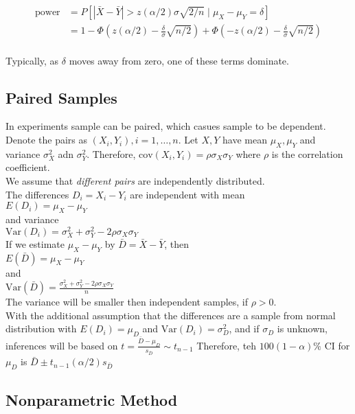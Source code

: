 \documentclass[12pt]{article}
\newcommand{\var}{\mathrm{Var}}
\newcommand{\cov}{\mathrm{cov}}
\theoremstyle{definition}
\begin{document}
\begin{align*}
\text{power}&=P[|\bar{X}-\bar{Y}|>z(\alpha/2)\sigma\sqrt{2/n}\mid \mu_X-\mu_Y=\delta]\\
&=1-\Phi(z(\alpha/2)-\frac{\delta}{\sigma}\sqrt{n/2})+\Phi(-z(\alpha/2)-\frac{\delta}{\sigma}\sqrt{n/2})
\end{align*}
\\
Typically, as $\delta$ moves away from zero, one of these terms dominate.



\subsection{Paired Samples}
In experiments sample can be paired, which casues sample to be dependent. Denote the pairs as $(X_i,Y_i), i=1, \ldots, n$. Let $X,Y$ have mean $\mu_X,\mu_Y$ and variance $\sigma_X^2$ adn $\sigma_Y^2$. Therefore, $\cov(X_i,Y_i)=\rho\sigma_X\sigma_Y$ where $\rho$ is the correlation coefficient.\\
We assume that \textit{different pairs} are independently distributed.\\
The differences $D_i=X_i-Y_i$ are independent with mean\\
$
E(D_i)=\mu_X-\mu_Y
$\\
and variance\\
$
\var(D_i)=\sigma_X^2+\sigma_Y^2-2\rho\sigma_X\sigma_Y
$\\
If we estimate $\mu_X-\mu_Y$ by $\bar{D}=\bar{X}-\bar{Y}$, then\\
$
E(\bar{D})=\mu_X-\mu_Y
$\\
and\\
$
\var(\bar{D})=\frac{\sigma_X^2+\sigma_Y^2-2\rho\sigma_X\sigma_Y}{n}
$\\
The variance will be smaller then independent samples, if $\rho>0$.\\
With the additional assumption that the differences are a sample from normal distribution with $E(D_i)=\mu_D$ and $\var(D_i)=\sigma_D^2$, and if $\sigma_D$ is unknown, inferences will be based on 
$
t=\frac{\bar{D}-\mu_D}{s_{\bar{D}}}\sim t_{n-1}
$
Therefore, teh $100(1-\alpha)\%$ CI for $\mu_D$ is $\bar{D}\pm t_{n-1}(\alpha/2)s_{\bar{D}}$
\subsection{Nonparametric Method}
\end{document}
